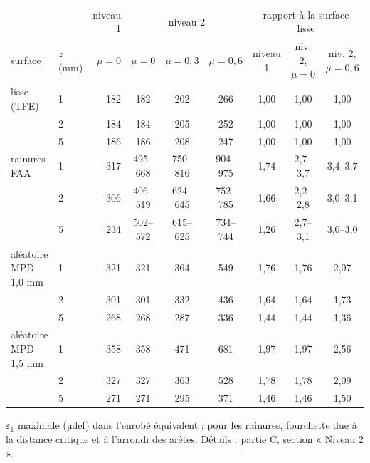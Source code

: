\documentclass[11pt,a4paper]{article}
\renewcommand{\epsilon}{\varepsilon}
\begin{document}
\begin{center}\scriptsize\setlength{\tabcolsep}{4pt}
\begin{tabular}{llr ccc ccc}\toprule
& & niveau 1 & \multicolumn{3}{c}{niveau 2} & \multicolumn{3}{c}{rapport à la surface lisse}\\
\cmidrule(lr){4-6}\cmidrule(lr){7-9}
surface & $z$ (mm) & $\mu=0$ & $\mu=0$ & $\mu=0{,}3$ & $\mu=0{,}6$ & niveau 1 & niv. 2, $\mu=0$ & niv. 2, $\mu=0{,}6$\\\midrule
lisse (TFE) & 1 & 182 & 182 & 202 & 266 & 1,00 & 1,00 & 1,00\\
 & 2 & 184 & 184 & 205 & 252 & 1,00 & 1,00 & 1,00\\
 & 5 & 186 & 186 & 208 & 247 & 1,00 & 1,00 & 1,00\\
\addlinespace
rainures FAA & 1 & 317 & 495--668 & 750--816 & 904--975 & 1,74 & 2,7--3,7 & 3,4--3,7\\
 & 2 & 306 & 406--519 & 624--645 & 752--785 & 1,66 & 2,2--2,8 & 3,0--3,1\\
 & 5 & 234 & 502--572 & 615--625 & 734--744 & 1,26 & 2,7--3,1 & 3,0--3,0\\
\addlinespace
aléatoire MPD 1,0 mm & 1 & 321 & 321 & 364 & 549 & 1,76 & 1,76 & 2,07\\
 & 2 & 301 & 301 & 332 & 436 & 1,64 & 1,64 & 1,73\\
 & 5 & 268 & 268 & 287 & 336 & 1,44 & 1,44 & 1,36\\
\addlinespace
aléatoire MPD 1,5 mm & 1 & 358 & 358 & 471 & 681 & 1,97 & 1,97 & 2,56\\
 & 2 & 327 & 327 & 363 & 528 & 1,78 & 1,78 & 2,09\\
 & 5 & 271 & 271 & 295 & 371 & 1,46 & 1,46 & 1,50\\
\bottomrule\end{tabular}\end{center}
$\epsilon_1$ maximale (µdef) dans l'enrobé équivalent ; pour les rainures, fourchette due à la
distance critique et à l'arrondi des arêtes. Détails : partie C, section « Niveau 2 ».
\end{document}
